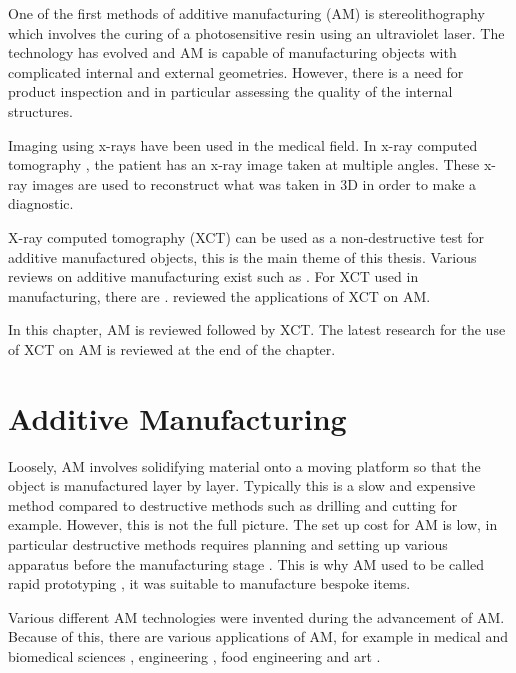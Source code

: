 One of the first methods of additive manufacturing (AM) is stereolithography \citep{kodama1981automatic, hull1986apparatus, 3d2019our} which involves the curing of a photosensitive resin using an ultraviolet laser. The technology has evolved and AM is capable of manufacturing objects with complicated internal and external geometries. However, there is a need for product inspection and in particular assessing the quality of the internal structures.

Imaging using x-rays \citep{rontgen1896on} have been used in the medical field. In x-ray computed tomography \citep{cormack1973reconstruction, hounsfield1973computerized, hounsfield1980computed}, the patient has an x-ray image taken at multiple angles. These x-ray images are used to reconstruct what was taken in 3D in order to make a diagnostic.

X-ray computed tomography (XCT) can be used as a non-destructive test for additive manufactured objects, this is the main theme of this thesis. Various reviews on additive manufacturing exist such as \cite{kruth1991material, kruth1998progress, pham1998comparison, gibson2010additive, wong2012review, ngo2018additive}. For XCT used in manufacturing, there are \cite{cantatore2011introduction, kruth2011computed, sun2012overview}. \cite{thompson2016x} reviewed the applications of XCT on AM.

In this chapter, AM is reviewed followed by XCT. The latest research for the use of XCT on AM is reviewed at the end of the chapter.

\section{Additive Manufacturing}

Loosely, AM involves solidifying material onto a moving platform so that the object is manufactured layer by layer. Typically this is a slow and expensive method compared to destructive methods such as drilling and cutting for example. However, this is not the full picture. The set up cost for AM is low, in particular destructive methods requires planning and setting up various apparatus before the manufacturing stage \citep{gibson2010additive}. This is why AM used to be called rapid prototyping \citep{kruth1991material}, it was suitable to manufacture bespoke items.

Various different AM technologies were invented during the advancement of AM. Because of this, there are various applications of AM, for example in medical and biomedical sciences \citep{kang20163d, kourra2018computed}, engineering \citep{cooper2015design}, food engineering \citep{godoi20163d} and art \citep{ornes2013mathematics, grossman2019bathsheba}.

